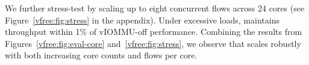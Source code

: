 We further stress-test \vfreename{} by scaling up to eight concurrent flows across 24 cores (see Figure~\ref{vfree:fig:stress}
    in the appendix).
Under excessive loads, \vfreename{} maintains throughput within 1\% of vIOMMU-off performance.
Combining the results from Figures~\ref{vfree:fig:eval-core} and~\ref{vfree:fig:stress}, 
we observe that \vfreename{} scales robustly with both increasing core counts and flows per core. 
\fi










